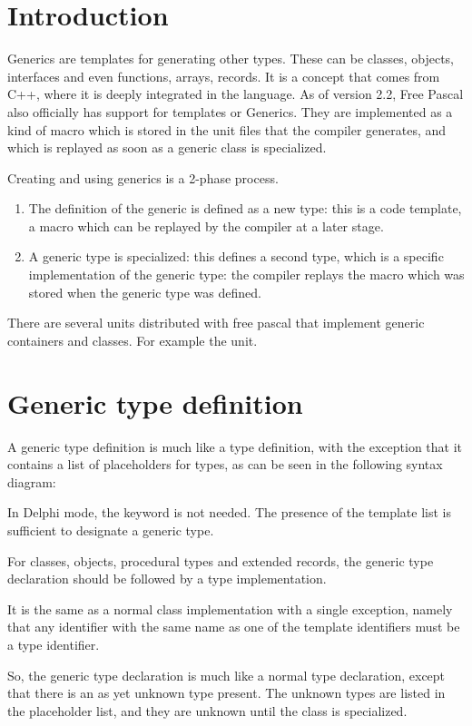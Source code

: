 \section{Introduction}
\label{se:genericsintroduction}
Generics are templates for generating other types. These can be classes, objects, interfaces and even functions, arrays, records.
It is a concept that comes from C++, where it is deeply integrated in the language.
As of version 2.2, Free Pascal also officially has support for templates or Generics.
They are implemented as a kind of macro which is stored in the unit files that the compiler generates,
and which is replayed as soon as a generic class is specialized.

Creating and using generics is a 2-phase process.
\begin{enumerate}
\item The definition of the generic is defined as a new type:
this is a code template, a macro which can be replayed by the compiler
at a later stage.
\item A generic type is specialized: this defines a second type,
which is a specific implementation of the generic type: the compiler
replays the macro which was stored when the generic type was defined.
\end{enumerate}
There are several units distributed with free pascal that implement generic
containers and classes. For example the  unit.

\section{Generic type definition}
\label{se:generictypedef}

A generic type definition is much like a type definition, with the exception that it contains a list of placeholders for types,
as can be seen in the following syntax diagram:

In Delphi mode, the keyword  is not needed. The presence of the template list is sufficient to designate a generic type.

For classes, objects, procedural types and extended records, the generic type declaration should be followed by a type implementation.

It is the same as a normal class implementation with a single exception, namely that any identifier with the same name as one of the template
identifiers must be a type identifier.

So, the generic type declaration is much like a normal type declaration, except that there is an as yet unknown type present.
The unknown types are listed in the placeholder list, and they are unknown until the class is specialized.

